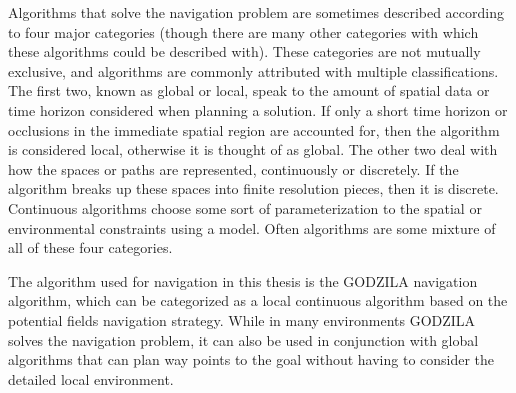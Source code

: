 
Algorithms that solve the navigation problem are sometimes described according to four major categories (though there are many
other categories with which these algorithms could be described with). These categories are not mutually exclusive, and algorithms
are commonly attributed with multiple classifications.
The first two, known as global or local, speak to the amount
of spatial data or time horizon considered when planning a solution. If only a short time horizon or occlusions in the immediate
spatial region are accounted for, then the algorithm is considered local, otherwise it is thought of as global.
The other two deal with how the spaces or paths are represented, continuously or discretely. If the algorithm breaks
up these spaces into finite resolution pieces, then it is discrete. Continuous algorithms choose some sort of parameterization
to the spatial or environmental constraints using a model. Often algorithms are some mixture of all of these four categories.

The algorithm used for navigation in this thesis is the GODZILA navigation algorithm, 
which can be categorized as a local continuous algorithm based on the potential fields navigation strategy. 
While in many environments GODZILA solves the navigation problem, it can also be used in conjunction with global algorithms
that can plan way points to the goal without having to consider the detailed local environment.

